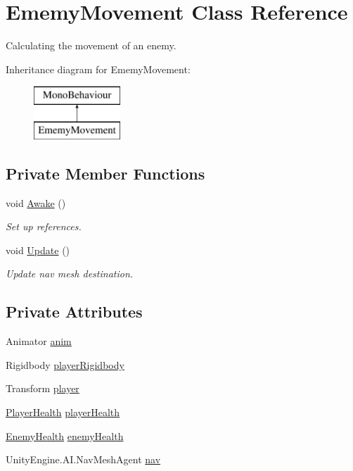 \hypertarget{class_ememy_movement}{}\section{Ememy\+Movement Class Reference}
\label{class_ememy_movement}


Calculating the movement of an enemy.  


Inheritance diagram for Ememy\+Movement\+:\begin{figure}[H]
\begin{center}
\leavevmode
\includegraphics[height=2.000000cm]{class_ememy_movement}
\end{center}
\end{figure}
\subsection*{Private Member Functions}
\begin{DoxyCompactItemize}
\item 
void \mbox{\hyperlink{class_ememy_movement_a4ec892e04366d0831a320492478a1e98}{Awake}} ()
\begin{DoxyCompactList}\small\item\em Set up references. \end{DoxyCompactList}\item 
void \mbox{\hyperlink{class_ememy_movement_a484abcd81c0d70758b4b6aa399de705d}{Update}} ()
\begin{DoxyCompactList}\small\item\em Update nav mesh destination. \end{DoxyCompactList}\end{DoxyCompactItemize}
\subsection*{Private Attributes}
\begin{DoxyCompactItemize}
\item 
Animator \mbox{\hyperlink{class_ememy_movement_a1ef0ecd0fd5e778ad644773edc24cc48}{anim}}
\item 
Rigidbody \mbox{\hyperlink{class_ememy_movement_aeb6b162d771e4a491218d4ac183070f4}{player\+Rigidbody}}
\item 
Transform \mbox{\hyperlink{class_ememy_movement_a126404bc424a207647635993a6fba33f}{player}}
\item 
\mbox{\hyperlink{class_player_health}{Player\+Health}} \mbox{\hyperlink{class_ememy_movement_a23f4953847bd11eac8109fbb5d108273}{player\+Health}}
\item 
\mbox{\hyperlink{class_enemy_health}{Enemy\+Health}} \mbox{\hyperlink{class_ememy_movement_ad8701c47ca38ed91e881aba78823f988}{enemy\+Health}}
\item 
Unity\+Engine.\+A\+I.\+Nav\+Mesh\+Agent \mbox{\hyperlink{class_ememy_movement_a25589092238b7711ef8b2edeb07a5787}{nav}}
\end{DoxyCompactItemize}


